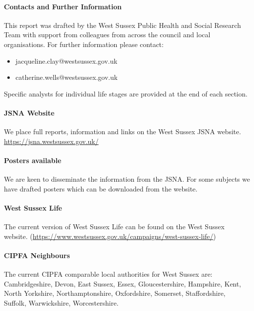 \paragraph{Contacts and Further Information} This report was drafted by the West Sussex Public Health and Social Research Team with support from colleagues from across the council and local organisations. For further information please contact:
\begin{itemize}[noitemsep]
\item jacqueline.clay@westsussex.gov.uk
\item catherine.wells@westsussex.gov.uk
\end{itemize}

Specific analysts for individual life stages are provided at the end of each section.

\paragraph{JSNA Website} We place full reports, information and links on the West Sussex JSNA website. \url{https://jsna.westsussex.gov.uk/}

\paragraph{Posters available} We are keen to disseminate the information from the JSNA. For some subjects we have drafted posters which can be downloaded from the website.

\paragraph{West Sussex Life} The current version of West Sussex Life can be found on the West Sussex website. (\url{https://www.westsussex.gov.uk/campaigns/west-sussex-life/})

\paragraph{CIPFA Neighbours} The current CIPFA comparable local authorities for West Sussex are: Cambridgeshire, Devon, East Sussex, Essex, Gloucestershire, Hampshire, Kent, North Yorkshire, Northamptonshire, Oxfordshire, Somerset, Staffordshire, Suffolk, Warwickshire, Worcestershire.

